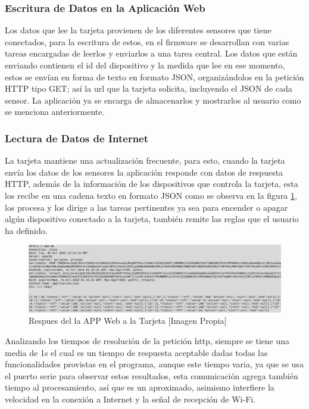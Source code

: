 \subsubsection*{Escritura de Datos en la Aplicación Web}

Los datos que lee la tarjeta provienen de los diferentes sensores que tiene conectados, para la escritura de estos, en el firmware se desarrollan con varias tareas encargadas de leerlos y enviarlos a una tarea central. Los datos que están enviando contienen el id del dispositivo y la medida que lee en ese momento, estos se envían en forma de texto en formato JSON, organizándolos en la petición HTTP tipo GET; así la url que la tarjeta solicita, incluyendo el JSON de cada sensor. La aplicación ya se encarga de almacenarlos y mostrarlos al usuario como se menciona anteriormente.\\

\subsubsection*{Lectura de Datos de Internet}

La tarjeta mantiene una actualización frecuente, para esto, cuando la tarjeta envía los datos de los sensores la aplicación responde con datos de respuesta HTTP, además de la información de los dispositivos que controla la tarjeta, esta los recibe en una cadena texto en formato JSON como se observa en la figura \ref{fig:httprqstesp}, los procesa y los dirige a las tareas pertinentes ya sea para encender o apagar algún dispositivo conectado a la tarjeta, también remite las reglas que el usuario ha definido.\\

\begin{figure}[!t]
	\centering
	\caption{Respues del la APP Web a la Tarjeta [Imagen Propia]}
	\label{fig:httprqstesp}
	\includegraphics[width=0.9\linewidth]{Imagenes/HTTPRqstesp}
\end{figure}

Analizando los tiempos de resolución de la petición http, siempre se tiene una media de 1s el cual es un tiempo de respuesta aceptable dadas todas las funcionalidades provistas en el programa, aunque este tiempo varia, ya que se usa el puerto serie para observar estos resultados, esta comunicación agrega también tiempo al procesamiento, así que es un aproximado, asimismo interfiere la velocidad en la conexión a Internet y la señal de recepción de Wi-Fi.\\

